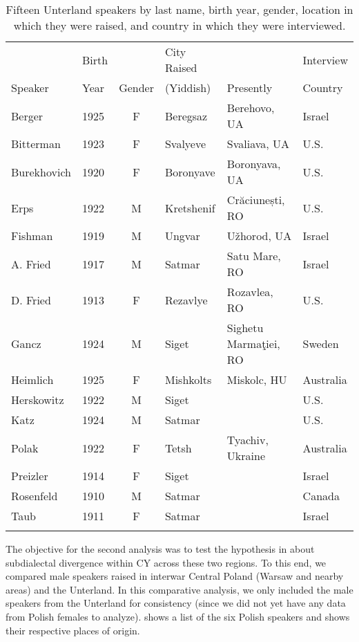 \documentclass[output=paper,colorlinks,citecolor=brown]{langscibook}
\begin{document}
\begin{table}
\small
\begin{tabular}{llclll}
    \lsptoprule
    & Birth &           & City Raised &             & Interview\\
    {Speaker} & {Year} & {Gender} & {(Yiddish)} & {Presently} & {Country}\\
    \midrule
    Berger & 1925 & F & Beregsaz & Berehovo, UA & Israel\\
    Bitterman & 1923 & F & Svalyeve & Svaliava, UA & U.S.\\
    Burekhovich & 1920 & F & Boronyave & Boronyava, UA & U.S.\\
    Erps & 1922 & M & Kretshenif & Crăciunești, RO & U.S.\\
    Fishman & 1919 & M & Ungvar & Užhorod, UA & Israel\\
    A. Fried & 1917 & M & Satmar & Satu Mare, RO & Israel\\
    D. Fried & 1913 & F & Rezavlye & Rozavlea, RO & U.S.\\
    Gancz & 1924 & M & Siget & Sighetu Marmaţiei, RO & Sweden\\
    Heimlich & 1925 & F & Mishkolts & Miskolc, HU & Australia\\
    Herskowitz & 1922 & M & Siget &  & U.S.\\
    Katz & 1924 & M & Satmar &  & U.S.\\
    Polak & 1922 & F & Tetsh & Tyachiv, Ukraine & Australia\\
    Preizler & 1914 & F & Siget &  & Israel\\
    Rosenfeld & 1910 & M & Satmar &  & Canada\\
    Taub & 1911 & F & Satmar &  & Israel\\
    \lspbottomrule
\end{tabular}
\caption{\label{tab:nove:1}Fifteen Unterland speakers by last name, birth year, gender, location in which they were raised, and country in which they were interviewed.}
\end{table}
  

The objective for the second analysis was to test the hypothesis in \citet{Nove2021} about subdialectal divergence within CY across these two regions. To this end, we compared male speakers raised in interwar Central Poland (Warsaw and nearby areas) and the Unterland. In this comparative analysis, we only included the male speakers from the Unterland for consistency (since we did not yet have any data from Polish females to analyze).  shows a list of the six Polish speakers and  shows their respective places of origin.
\end{document}
